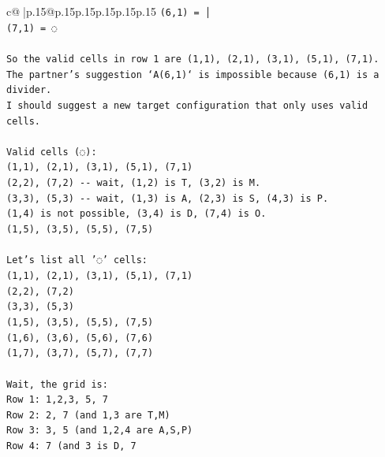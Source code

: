 \documentclass{article}
\begin{document}
{\begin{supertabular}{c@{$\;$}|p{.15\linewidth}@{}p{.15\linewidth}p{.15\linewidth}p{.15\linewidth}p{.15\linewidth}p{.15\linewidth}}
{{{\texttt{(6,1) = │} \\
\texttt{(7,1) = ◌} \\
\\ 
\texttt{So the valid cells in row 1 are (1,1), (2,1), (3,1), (5,1), (7,1).} \\
\texttt{The partner's suggestion `A(6,1)` is impossible because (6,1) is a divider.} \\
\texttt{I should suggest a new target configuration that only uses valid cells.} \\
\\ 
\texttt{Valid cells (◌):} \\
\texttt{(1,1), (2,1), (3,1), (5,1), (7,1)} \\
\texttt{(2,2), (7,2) {-}{-} wait, (1,2) is T, (3,2) is M.} \\
\texttt{(3,3), (5,3) {-}{-} wait, (1,3) is A, (2,3) is S, (4,3) is P.} \\
\texttt{(1,4) is not possible, (3,4) is D, (7,4) is O.} \\
\texttt{(1,5), (3,5), (5,5), (7,5)} \\
\\ 
\texttt{Let's list all '◌' cells:} \\
\texttt{(1,1), (2,1), (3,1), (5,1), (7,1)} \\
\texttt{(2,2), (7,2)} \\
\texttt{(3,3), (5,3)} \\
\texttt{(1,5), (3,5), (5,5), (7,5)} \\
\texttt{(1,6), (3,6), (5,6), (7,6)} \\
\texttt{(1,7), (3,7), (5,7), (7,7)} \\
\\ 
\texttt{Wait, the grid is:} \\
\texttt{Row 1: 1,2,3, 5, 7} \\
\texttt{Row 2: 2, 7 (and 1,3 are T,M)} \\
\texttt{Row 3: 3, 5 (and 1,2,4 are A,S,P)} \\
\texttt{Row 4: 7 (and 3 is D, 7} \\
            }
        }
    }
     \\ \\


\end{supertabular}}
\end{document}

